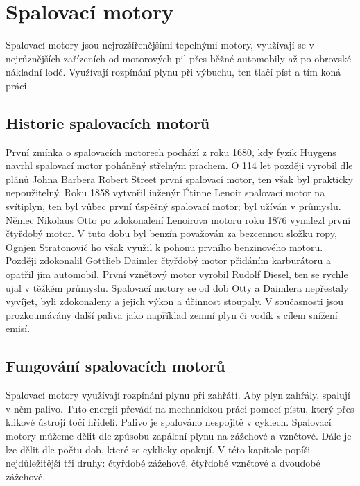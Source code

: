 \section{Spalovací motory}
{Spalovací motory jsou nejrozšířenějšími tepelnými motory, využívají se v nejrůznějších zařízeních od motorových pil přes běžné automobily až po obrovské nákladní lodě. Využívají rozpínání plynu při výbuchu, ten tlačí píst a tím koná práci.}

\subsection{Historie spalovacích motorů}\label{sc:HistorieSpalovacichMotoru}
{První zmínka o spalovacích motorech pochází z roku 1680, kdy fyzik Huygens navrhl spalovací motor poháněný střelným prachem. O 114 let později vyrobil dle plánů Johna Barbera Robert Street první spalovací motor, ten však byl prakticky nepoužitelný. Roku 1858 vytvořil inženýr Étinne Lenoir spalovací motor na svítiplyn, ten byl vůbec první úspěšný spalovací motor; byl užíván v průmyslu.}
\cite{vutb:vyzkumneSpalovaciMotory}\cite{ANNALS:TheHistoryOfTheInternalCombustionEngine}\odst
{Němec Nikolaus Otto po zdokonalení Lenoirova motoru roku 1876 vynalezl první čtyřdobý motor. V tuto dobu byl benzín považován za bezcennou složku ropy, Ognjen Stratonović ho však využil k pohonu prvního benzinového motoru. Později zdokonalil Gottlieb Daimler čtyřdobý motor přidáním karburátoru a opatřil jím automobil. První vznětový motor vyrobil Rudolf Diesel, ten se rychle ujal v těžkém průmyslu.}
\cite{vutb:vyzkumneSpalovaciMotory}\cite{ANNALS:TheHistoryOfTheInternalCombustionEngine}\odst
{Spalovací motory se od dob Otty a Daimlera nepřestaly vyvíjet, byli zdokonaleny a jejich výkon a účinnost stoupaly. V současnosti jsou prozkoumávány další paliva jako například zemní plyn či vodík s cílem snížení emisí.}
\cite{vutb:vyzkumneSpalovaciMotory}

\subsection{Fungování spalovacích motorů}
{Spalovací motory využívají rozpínání plynu při zahřátí. Aby plyn zahřály, spalují v něm palivo. Tuto energii převádí na mechanickou práci pomocí pístu, který přes klikové ústrojí točí hřídelí. Palivo je spalováno nespojitě v cyklech.}\odst
{Spalovací motory můžeme dělit dle způsobu zapálení plynu na zážehové a vznětové. Dále je lze dělit dle počtu dob, které se cyklicky opakují. V této kapitole popíši nejdůležitější tři druhy: čtyřdobé zážehové, čtyřdobé vznětové a dvoudobé zážehové.}
\cite{vutb:vyzkumneSpalovaciMotory}

